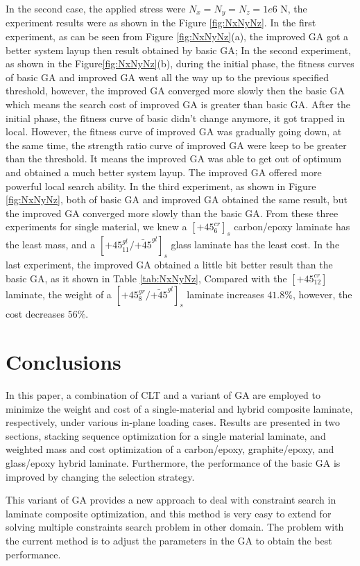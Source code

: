 \documentclass[USenglish]{article}
\begin{document}
  In the second case, the applied stress were $N_x=N_y=N_z=1e6$ N, the experiment results were as
shown in the Figure \ref{fig:NxNyNz}. In the first experiment, as can be seen from Figure \ref{fig:NxNyNz}(a), the improved GA got a
better system layup then result obtained by basic GA; In the second experiment, as shown in the Figure\ref{fig:NxNyNz}(b), during
the initial phase, the fitness curves of basic GA and improved GA went all the way up to the
previous specified threshold, however, the improved GA converged more slowly then the basic GA which
means the search cost of improved GA is greater than basic GA. After the initial phase, the fitness
curve of basic didn't change anymore, it got trapped in local.  However, the fitness curve of
improved GA was gradually going down, at the same time,  the strength ratio curve of improved GA
were keep to be greater than the threshold. It means the improved GA was able to get out of optimum
and obtained a much better system layup.  The improved GA offered more powerful local search
ability. In the third experiment, as shown in Figure \ref{fig:NxNyNz}, both of basic GA and improved
GA obtained the same result, but the improved GA converged more slowly than the basic GA. From these
three experiments for single material, we knew a $[\text{+}45_{6}^{cr}]_s$ carbon/epoxy laminate has
the least mass, and a $[\text{+}45_{11}^{gl}/\bar{\text{+}45}^{gl}]_s$ glass laminate has the least
cost. In the last experiment, the improved GA obtained a little bit better result than the basic GA,
as it shown in Table \ref{tab:NxNyNz}, Compared with the $[\text{+}45_{12}^{cr}]$ laminate, the
weight of a $[\text{+}45_8^{gr}/\bar{\text{+}45}^{gl}]_s$ laminate increases $41.8\%$, however, the
cost decreases $56\%$.


\section{Conclusions}
In this paper, a combination of CLT and a variant of GA are employed to minimize the weight and cost
of a single-material and hybrid composite laminate, respectively, under various in-plane loading
cases.  Results are presented in two sections, stacking sequence optimization for a single material
laminate, and weighted  mass and cost optimization of a carbon/epoxy, graphite/epoxy, and
glass/epoxy hybrid laminate.  Furthermore, the performance of the basic GA is improved by changing the
selection strategy.

   This variant of GA provides a new approach to deal with constraint search in laminate composite
optimization, and this method is very easy to extend for solving multiple constraints search problem in other
domain. The problem with the current method is to adjust the parameters in the GA to obtain the best
performance. 




\end{document}
